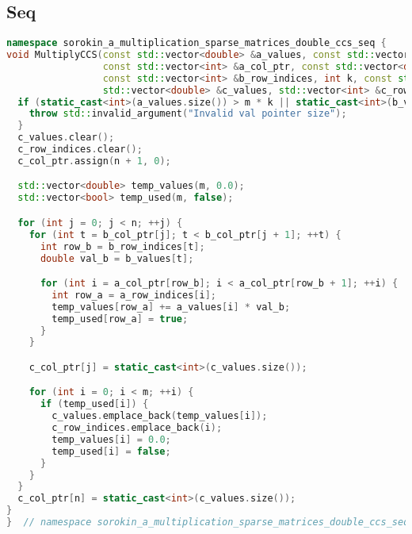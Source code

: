 \documentclass[12pt]{article}
\begin{document}
\subsection*{Seq}
\begin{lstlisting}[language=C++]
namespace sorokin_a_multiplication_sparse_matrices_double_ccs_seq {
void MultiplyCCS(const std::vector<double> &a_values, const std::vector<int> &a_row_indices, int m,
                 const std::vector<int> &a_col_ptr, const std::vector<double> &b_values,
                 const std::vector<int> &b_row_indices, int k, const std::vector<int> &b_col_ptr,
                 std::vector<double> &c_values, std::vector<int> &c_row_indices, int n, std::vector<int> &c_col_ptr) {
  if (static_cast<int>(a_values.size()) > m * k || static_cast<int>(b_values.size()) > k * n) {
    throw std::invalid_argument("Invalid val pointer size");
  }
  c_values.clear();
  c_row_indices.clear();
  c_col_ptr.assign(n + 1, 0);

  std::vector<double> temp_values(m, 0.0);
  std::vector<bool> temp_used(m, false);

  for (int j = 0; j < n; ++j) {
    for (int t = b_col_ptr[j]; t < b_col_ptr[j + 1]; ++t) {
      int row_b = b_row_indices[t];
      double val_b = b_values[t];

      for (int i = a_col_ptr[row_b]; i < a_col_ptr[row_b + 1]; ++i) {
        int row_a = a_row_indices[i];
        temp_values[row_a] += a_values[i] * val_b;
        temp_used[row_a] = true;
      }
    }

    c_col_ptr[j] = static_cast<int>(c_values.size());

    for (int i = 0; i < m; ++i) {
      if (temp_used[i]) {
        c_values.emplace_back(temp_values[i]);
        c_row_indices.emplace_back(i);
        temp_values[i] = 0.0;
        temp_used[i] = false;
      }
    }
  }
  c_col_ptr[n] = static_cast<int>(c_values.size());
}
}  // namespace sorokin_a_multiplication_sparse_matrices_double_ccs_seq
\end{lstlisting}
\end{document}
